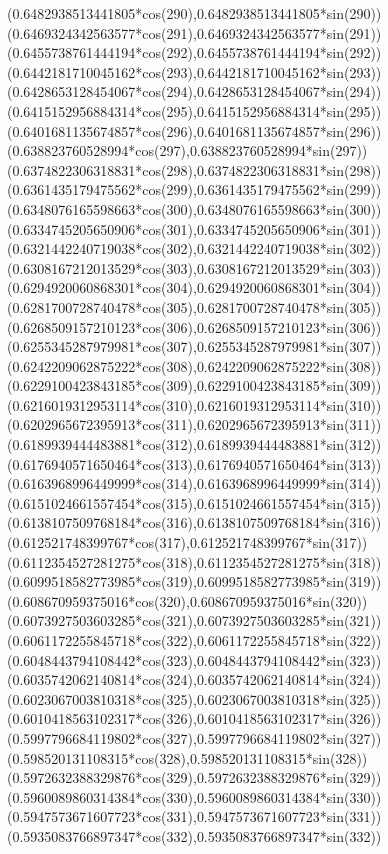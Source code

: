 {({0.6482938513441805*cos(290)},{0.6482938513441805*sin(290)})
({0.6469324342563577*cos(291)},{0.6469324342563577*sin(291)})
({0.6455738761444194*cos(292)},{0.6455738761444194*sin(292)})
({0.6442181710045162*cos(293)},{0.6442181710045162*sin(293)})
({0.6428653128454067*cos(294)},{0.6428653128454067*sin(294)})
({0.6415152956884314*cos(295)},{0.6415152956884314*sin(295)})
({0.6401681135674857*cos(296)},{0.6401681135674857*sin(296)})
({0.638823760528994*cos(297)},{0.638823760528994*sin(297)})
({0.6374822306318831*cos(298)},{0.6374822306318831*sin(298)})
({0.6361435179475562*cos(299)},{0.6361435179475562*sin(299)})
({0.6348076165598663*cos(300)},{0.6348076165598663*sin(300)})
({0.6334745205650906*cos(301)},{0.6334745205650906*sin(301)})
({0.6321442240719038*cos(302)},{0.6321442240719038*sin(302)})
({0.6308167212013529*cos(303)},{0.6308167212013529*sin(303)})
({0.6294920060868301*cos(304)},{0.6294920060868301*sin(304)})
({0.6281700728740478*cos(305)},{0.6281700728740478*sin(305)})
({0.6268509157210123*cos(306)},{0.6268509157210123*sin(306)})
({0.6255345287979981*cos(307)},{0.6255345287979981*sin(307)})
({0.6242209062875222*cos(308)},{0.6242209062875222*sin(308)})
({0.6229100423843185*cos(309)},{0.6229100423843185*sin(309)})
({0.6216019312953114*cos(310)},{0.6216019312953114*sin(310)})
({0.6202965672395913*cos(311)},{0.6202965672395913*sin(311)})
({0.6189939444483881*cos(312)},{0.6189939444483881*sin(312)})
({0.6176940571650464*cos(313)},{0.6176940571650464*sin(313)})
({0.6163968996449999*cos(314)},{0.6163968996449999*sin(314)})
({0.6151024661557454*cos(315)},{0.6151024661557454*sin(315)})
({0.6138107509768184*cos(316)},{0.6138107509768184*sin(316)})
({0.612521748399767*cos(317)},{0.612521748399767*sin(317)})
({0.6112354527281275*cos(318)},{0.6112354527281275*sin(318)})
({0.6099518582773985*cos(319)},{0.6099518582773985*sin(319)})
({0.608670959375016*cos(320)},{0.608670959375016*sin(320)})
({0.6073927503603285*cos(321)},{0.6073927503603285*sin(321)})
({0.6061172255845718*cos(322)},{0.6061172255845718*sin(322)})
({0.6048443794108442*cos(323)},{0.6048443794108442*sin(323)})
({0.6035742062140814*cos(324)},{0.6035742062140814*sin(324)})
({0.6023067003810318*cos(325)},{0.6023067003810318*sin(325)})
({0.6010418563102317*cos(326)},{0.6010418563102317*sin(326)})
({0.5997796684119802*cos(327)},{0.5997796684119802*sin(327)})
({0.598520131108315*cos(328)},{0.598520131108315*sin(328)})
({0.5972632388329876*cos(329)},{0.5972632388329876*sin(329)})
({0.5960089860314384*cos(330)},{0.5960089860314384*sin(330)})
({0.5947573671607723*cos(331)},{0.5947573671607723*sin(331)})
({0.5935083766897347*cos(332)},{0.5935083766897347*sin(332)})
}
